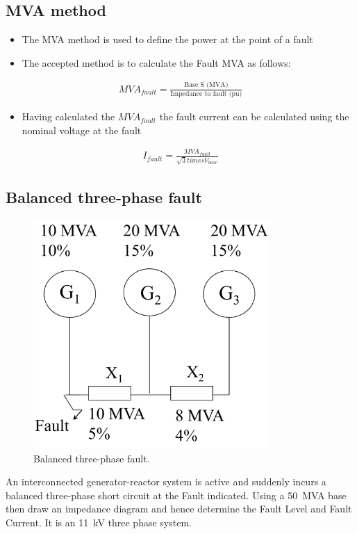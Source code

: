 \subsection{MVA method}
\begin{itemize}
	\item The MVA method is used to define the power at the point of a fault
	\item The accepted method is to calculate the Fault MVA as follows:
\end{itemize}
\begin{gather}
	MVA_{fault} = \frac{\textrm{Base S (MVA)}}{\textrm{Impedance to fault (pu)}}
\end{gather}
\begin{itemize}
	\item Having calculated the $\si{MVA}_{fault}$ the fault current can be calculated using the nominal voltage at the fault
\end{itemize}
\begin{gather}
	I_{fault} = \frac{\si{MVA}_{fault}}{\sqrt{3}times V_{base}}
\end{gather}
\subsection{Balanced three-phase fault}
\begin{figure}[H]
	\centering
	\includegraphics[width = 0.8\textwidth]{./img/figure17.png}
	\caption{Balanced three-phase fault.}
\end{figure}
An interconnected generator-reactor system is active and suddenly incurs a balanced three-phase short circuit at the Fault indicated. Using a \SI{50}{MVA} base then draw an impedance diagram and hence determine the Fault Level and Fault Current. It is an \SI{11}{kV} three phase system.
